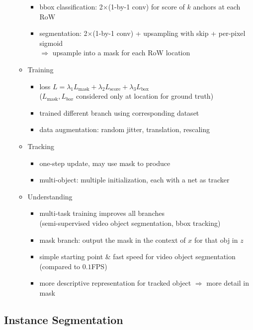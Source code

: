 \begin{itemize}
\begin{itemize}
\begin{itemize}
		\item bbox classification: 2$\times$(1-by-1 conv) for score of $k$ anchors at each RoW
		\item segmentation: 2$\times$(1-by-1 conv) + upsampling with skip + per-pixel sigmoid \\
		$\Rightarrow$ upsample into a mask for each RoW location
		\end{itemize}
	\item Training
		\begin{itemize}
		\item loss $L = \lambda_1 L_\text{mask} +\lambda_2 L_\text{score} +\lambda_3 L_\text{box}$ \\
		($L_\text{mask}, L_{box}$ considered only at location for ground truth)
		\item trained different branch using corresponding dataset
		\item data augmentation: random jitter, translation, rescaling
		\end{itemize}
	\item Tracking
		\begin{itemize}
		\item one-step update, may use mask to produce 
		\item multi-object: multiple initialization, each with a net as tracker
		\end{itemize}
	\item Understanding
		\begin{itemize}
		\item multi-task training improves all branches \\
		(semi-supervised video object segmentation, bbox tracking)
		\item mask branch: output the mask in the context of $x$ for that obj in $z$
		\item simple starting point \& fast speed for video object segmentation (compared to $0.1$FPS)
		\item more descriptive representation for tracked object $\Rightarrow$ more detail in mask
		\end{itemize}
	\end{itemize}
\end{itemize}

\subsection{Instance Segmentation}
